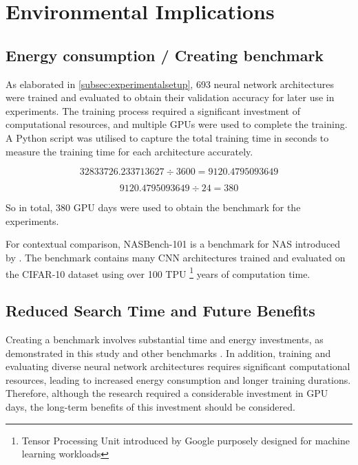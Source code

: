 \section{Environmental Implications}
\subsection{Energy consumption / Creating benchmark}

As elaborated in \cref{subsec:experimentalsetup}, 693 neural network architectures were trained and evaluated to obtain their validation accuracy for later use in experiments. The training process required a significant investment of computational resources, and multiple \glspl{GPU} were used to complete the training. A Python script was utilised to capture the total training time in seconds to measure the training time for each architecture accurately.

\begin{equation*} 32833726.233713627 \div 3600 = 9120.4795093649 \end{equation*}

\begin{equation*}
    9120.4795093649 \div 24 = 380
\end{equation*}

So in total, 380 \gls{GPU} days were used to obtain the benchmark for the experiments. 

For contextual comparison, NASBench-101 is a benchmark for \gls{NAS} introduced by \autocite{ying2019bench}. The benchmark contains many \gls{CNN} architectures trained and evaluated on the CIFAR-10 dataset using over 100 TPU \footnote{Tensor Processing Unit introduced by Google purposely designed for machine learning workloads} years of computation time. 

\subsection{Reduced Search Time and Future Benefits}

Creating a benchmark involves substantial time and energy investments, as demonstrated in this study and other benchmarks \autocite{dong2020bench, ying2019bench, tu2021bench}. In addition, training and evaluating diverse neural network architectures requires significant computational resources, leading to increased energy consumption and longer training durations. Therefore, although the research required a considerable investment in \gls{GPU} days, the long-term benefits of this investment should be considered. 

